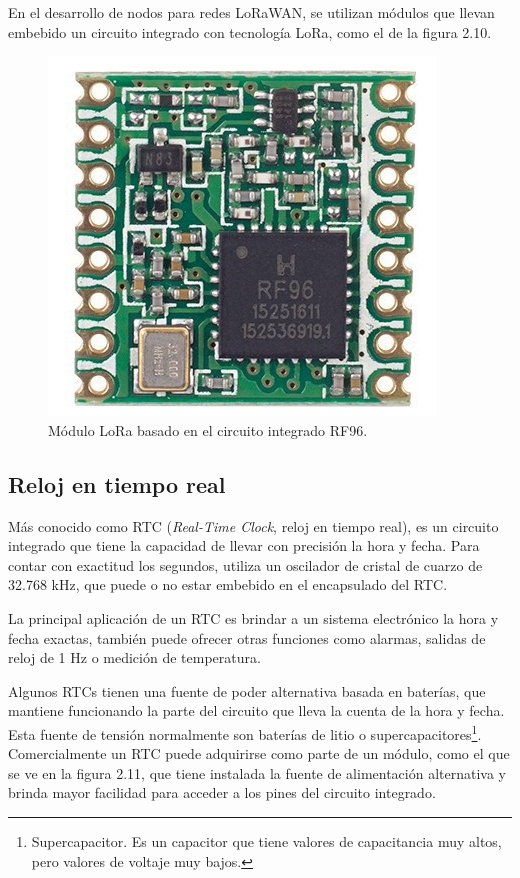 En el desarrollo de nodos para redes LoRaWAN, se utilizan módulos que llevan embebido un circuito integrado con tecnología LoRa, como el de la figura 2.10.

\begin{figure}[h]
	\centering
	\includegraphics[scale=0.32]{./Figures/lora_module.jpg}
	\caption{Módulo LoRa basado en el circuito integrado RF96\protect\footnotemark.}
	\label{fig:cuadradoAzul}
\end{figure}


\subsection{Reloj en tiempo real}

Más conocido como RTC (\textit{Real-Time Clock}, reloj en tiempo real), es un circuito integrado que tiene la capacidad de llevar con precisión la hora y fecha. Para contar con exactitud los segundos, utiliza un oscilador de cristal de cuarzo de 32.768 kHz, que puede o no estar embebido en el encapsulado del RTC.

La principal aplicación de un RTC es brindar a un sistema electrónico la hora y fecha exactas,  también puede ofrecer otras funciones como alarmas, salidas de reloj de 1 Hz o medición de temperatura.

Algunos RTCs tienen una fuente de poder alternativa basada en baterías, que mantiene funcionando la parte del circuito que lleva la cuenta de la hora y fecha. Esta fuente de tensión normalmente son baterías de litio o supercapacitores\footnote{Supercapacitor. Es un capacitor que tiene valores de capacitancia muy altos, pero valores de voltaje muy bajos.}. Comercialmente un RTC puede adquirirse como parte de un módulo, como el que se ve en la figura 2.11, que tiene instalada la fuente de alimentación alternativa y brinda mayor facilidad para acceder a los pines del circuito integrado.

